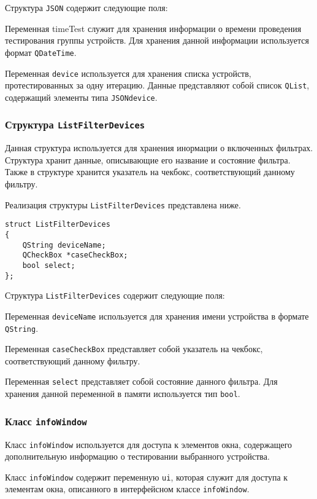 Структура \texttt{JSON} содержит следующие поля:
\begin{enum}
	\item Переменная timeTest служит для хранения информации о времени проведения тестирования группы устройств. Для
		хранения данной информации используется формат \texttt{QDateTime}.
	\item Переменная \texttt{device} используется для хранения списка устройств, протестированных за одну итерацию.
		Данные представляют собой список \texttt{QList}, содержащий элементы типа \texttt{JSONdevice}.
\end{enum}

\subsubsection{Структура \texttt{ListFilterDevices}}
Данная структура используется для хранения инормации о включенных фильтрах. Структура хранит данные, описывающие его
название и состояние фильтра. Также в структуре хранится указатель на чекбокс, соответствующий данному фильтру.

Реализация структуры \texttt{ListFilterDevices} представлена ниже.
\medskip
\begin{verbatim}
struct ListFilterDevices
{
	QString deviceName;
	QCheckBox *caseCheckBox;
	bool select;
};
\end{verbatim}
\medskip

Структура \texttt{ListFilterDevices} содержит следующие поля:
\begin{enum}
	\item Переменная \texttt{deviceName} используется для хранения имени устройства в формате \texttt{QString}.
	\item Переменная \texttt{caseCheckBox} представляет собой указатель на чекбокс, соответствующий данному фильтру.
	\item Переменная \texttt{select} представляет собой состояние данного фильтра. Для хранения данной переменной в
		памяти используется тип \texttt{bool}.
\end{enum}

\subsubsection{Класс \texttt{infoWindow}}
Класс \texttt{infoWindow} используется для доступа к элементов окна, содержащего дополнительную информацию о
тестировании выбранного устройства.

Класс \texttt{infoWindow} содержит переменную \texttt{ui}, которая служит для доступа к элементам окна, описанного в
интерфейсном классе \texttt{infoWindow}.

